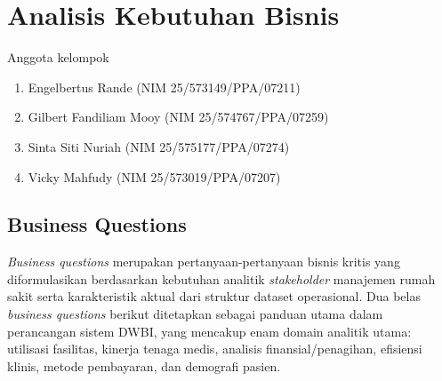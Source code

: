 
\chapter{Analisis Kebutuhan Bisnis}
\begin{mybox}{Anggota kelompok}
\begin{enumerate}
    \itemsep0em
	\item Engelbertus Rande (NIM 25/573149/PPA/07211)
	\item Gilbert Fandiliam Mooy (NIM 25/574767/PPA/07259)
	\item Sinta Siti Nuriah (NIM 25/575177/PPA/07274)
	\item Vicky Mahfudy (NIM 25/573019/PPA/07207)
\end{enumerate}
\end{mybox}

 
\section{Business Questions}
 
\textit{Business questions} merupakan pertanyaan-pertanyaan bisnis kritis yang diformulasikan berdasarkan kebutuhan analitik \textit{stakeholder} manajemen rumah sakit serta karakteristik aktual dari struktur dataset operasional. Dua belas \textit{business questions} berikut ditetapkan sebagai panduan utama dalam perancangan sistem DWBI, yang mencakup enam domain analitik utama: utilisasi fasilitas, kinerja tenaga medis, analisis finansial/penagihan, efisiensi klinis, metode pembayaran, dan demografi pasien.
 
